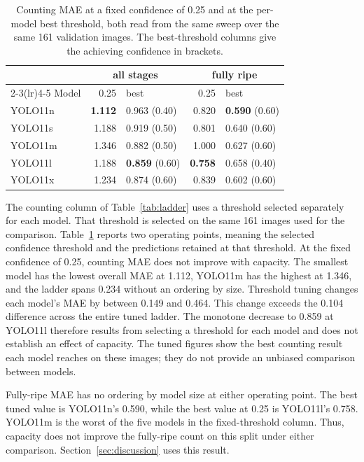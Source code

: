 \begin{table}[t]
\caption{Counting MAE at a fixed confidence of 0.25 and at the per-model best
threshold, both read from the same sweep over the same 161 validation images.
The best-threshold columns give the achieving confidence in brackets.}
\label{tab:ladder-thresh}
\centering
\begin{tabular}{lrlrl}
\toprule
 & \multicolumn{2}{c}{all stages} & \multicolumn{2}{c}{fully ripe} \\
\cmidrule(lr){2-3}\cmidrule(lr){4-5}
Model & 0.25 & best & 0.25 & best \\
\midrule
YOLO11n & \textbf{1.112} & 0.963 (0.40) & 0.820 & \textbf{0.590} (0.60) \\
YOLO11s & 1.188 & 0.919 (0.50) & 0.801 & 0.640 (0.60) \\
YOLO11m & 1.346 & 0.882 (0.50) & 1.000 & 0.627 (0.60) \\
YOLO11l & 1.188 & \textbf{0.859} (0.60) & \textbf{0.758} & 0.658 (0.40) \\
YOLO11x & 1.234 & 0.874 (0.60) & 0.839 & 0.602 (0.60) \\
\bottomrule
\end{tabular}
\end{table}

The counting column of Table~\ref{tab:ladder} uses a threshold selected
separately for each model. That threshold is selected on the same 161 images
used for the comparison. Table~\ref{tab:ladder-thresh} reports two operating
points, meaning the selected confidence threshold and the predictions retained
at that threshold. At the fixed confidence of 0.25, counting MAE does not
improve with capacity. The smallest model has the lowest overall MAE at 1.112,
YOLO11m has the highest at 1.346, and the ladder spans 0.234 without an ordering
by size. Threshold tuning changes each model's MAE by between 0.149 and 0.464.
This change exceeds the 0.104 difference across the entire tuned ladder. The
monotone decrease to 0.859 at YOLO11l therefore results from selecting a
threshold for each model and does not establish an effect of capacity. The
tuned figures show the best counting result each model reaches on these images;
they do not provide an unbiased comparison between models.

Fully-ripe MAE has no ordering by model size at either operating point. The best
tuned value is YOLO11n's 0.590, while the best value at 0.25 is YOLO11l's 0.758.
YOLO11m is the worst of the five models in the fixed-threshold column. Thus,
capacity does not improve the fully-ripe count on this split under either
comparison. Section~\ref{sec:discussion} uses this result.

